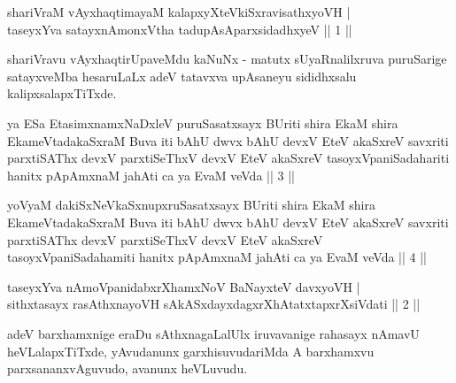 

\begin{shl}
shariVraM vAyxhaqtimayaM kalapxyXteV\s kiSxravisathxyoVH | \\
taseyxYva satayxnAmonxV\s tha tadupAsAparxsidadhxyeV \hfill ||  1 || 
\end{shl}

\begin{artha}
shariVravu vAyxhaqtirUpaveMdu kaNuNx - matutx sUyaRnalilxruva puruSarige satayxveMba hesaruLaLx adeV tatavxva upAsaneyu sididhxsalu kalipxsalapxTiTxde.
\end{artha}

\begin{kandikeshl}
ya ESa EtasimxnamxNaDxleV puruSasatxsayx BUriti shira EkaM shira EkameV\-tadakaSxraM Buva iti bAhU dwvx bAhU devxV EteV akaSxreV savxriti parxtiSAThx devxV parxtiSeThxV devxV EteV akaSxreV tasoyxVpaniSadahariti hanitx pApAmxnaM ja{\null}hAti ca ya EvaM veVda || 3 ||
\end{kandikeshl}

\begin{kandikeshl}
yoV\s yaM dakiSxNeV\s kaSxnupxruSasatxsayx BUriti shira EkaM shira EkameV\-tadakaSxraM Buva iti bAhU dwvx bAhU devxV EteV akaSxreV savxriti parxtiSAThx devxV parxtiSeThxV devxV EteV akaSxreV tasoyxVpaniSadahamiti hanitx pApAmxnaM ja{\null}hAti ca ya EvaM veVda || 4 ||
\end{kandikeshl}


\begin{shl}
taseyxYva nAmoVpanidabxrXhamxNoV BaNayxteV davxyoVH | \\
sithxtasayx rasAthxnayoVH sAkASxdayxdagxrXhAtatxtapxrXsiVdati \hfill ||  2 || 
\end{shl}

\begin{artha}
adeV barxhamxnige eraDu sAthxnagaLalUlx iruvavanige rahasayx nAmavU heVLalapxTiTxde, yAvudanunx garxhisuvudariMda A barxhamxvu parxsananxvAguvudo, avanunx heVLuvudu.
\end{artha}

